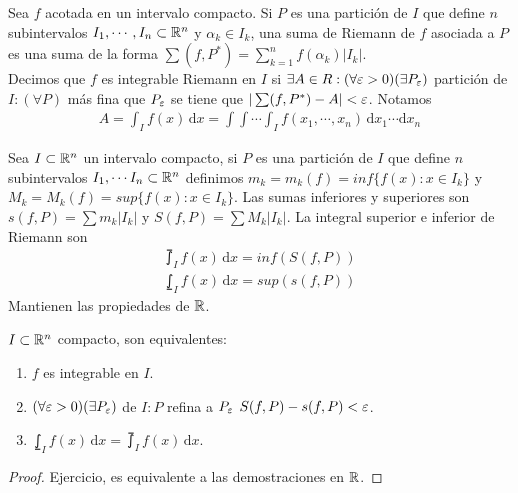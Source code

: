 \begin{definition}
  Sea $f$ acotada en un intervalo compacto. Si $P$ es una partición de $I$ que define $n$ subintervalos $I_1, \cdots, I_n \subset \mathbb{R}^n$ y $\alpha_k \in I_k$, una suma de Riemann de $f$ asociada a $P$ es una suma de la forma $\sum (f, P^*) = \sum_{k = 1}^n f(\alpha_k) |I_k|$. \\
  Decimos que $f$ es integrable Riemann en $I$ si $\exists A \in R : (\forall \varepsilon > 0)(\exists P_{\varepsilon})$ partición de $I : (\forall P)$ más fina que $P_{\varepsilon}$ se tiene que $|\sum(f, P^*) - A| < \varepsilon$.
  Notamos \begin{align*}
    A =  \int_I f(x) \, \mathrm{d}x = \int \int \cdots \int_I f(x_1, \cdots, x_n)\, \mathrm{d}x_1 \cdots \mathrm{d}x_n
  \end{align*}
\end{definition}

\begin{definition}
  Sea $I \subset \mathbb{R}^n$ un intervalo compacto, si $P$ es una partición de $I$ que define $n$ subintervalos $I_1, \cdots I_n \subset \mathbb{R}^n$ definimos $m_k = m_k(f) = inf\{f(x) : x \in I_k\}$ y $M_k = M_k(f) = sup\{f(x) : x \in I_k\}$.
  Las sumas inferiores y superiores son $s(f, P) = \sum m_k |I_k|$ y $S(f, P) = \sum M_k |I_k|$.
  La integral superior e inferior de Riemann son \begin{align*}
    \upint_I f(x) \, \mathrm{d}x = inf(S(f, P))
  \end{align*}
  \begin{align*}
    \lowint_I f(x)\, \mathrm{d}x = sup(s(f, P))
  \end{align*}
  Mantienen las propiedades de $\mathbb{R}$.
\end{definition}

\begin{theorem}
  $I \subset \mathbb{R}^n$ compacto, son equivalentes:
  \begin{enumerate}
    \item $f$ es integrable en $I$.
    \item $(\forall \varepsilon > 0)(\exists P_{\varepsilon})$ de $I : P$ refina a $P_{\varepsilon}$ $S(f, P) - s(f, P) < \varepsilon$.
    \item $\lowint_I f(x) \, \mathrm{d}x = \upint_I f(x) \, \mathrm{d}x$.
  \end{enumerate}
  \begin{proof}
    Ejercicio, es equivalente a las demostraciones en $\mathbb{R}$.
  \end{proof}
\end{theorem}

